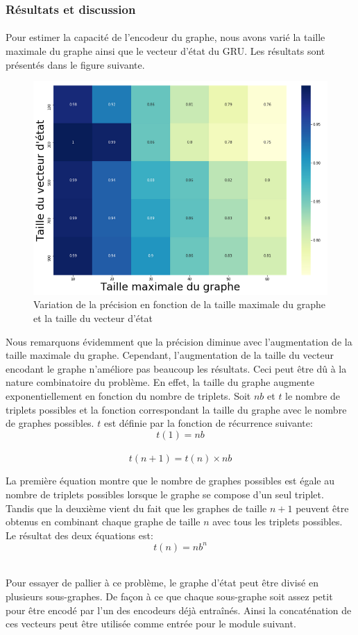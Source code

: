 \subsubsection{Résultats et discussion}
\paragraph{}Pour estimer la capacité de l'encodeur du graphe, nous avons varié la taille maximale du graphe ainsi que le vecteur d'état du GRU. Les résultats sont présentés dans le figure suivante.
\begin{figure}[H] 
	\centering
	\includegraphics[width=0.95\linewidth]{images/Realisation/DM/heatmap.png}
	\caption{Variation de la précision en fonction de la taille maximale du graphe et la taille du vecteur d'état}\label{heatmap}
\end{figure}
\par Nous remarquons évidemment que la précision diminue avec l'augmentation de la taille maximale du graphe. Cependant, l'augmentation de la taille du vecteur encodant le graphe n'améliore pas beaucoup les résultats. Ceci peut être dû à la nature combinatoire du problème. En effet, la taille du graphe augmente exponentiellement en fonction du nombre de triplets. Soit $nb$ et $t$ le nombre de triplets possibles et la fonction correspondant la taille du graphe avec le nombre de graphes possibles. $t$ est définie par la fonction de récurrence suivante:
\[t(1) = nb\]\\
\[t(n+1) = t(n) \times nb\]
\par La première équation montre que le nombre de graphes possibles est égale au nombre de triplets possibles lorsque le graphe se compose d'un seul triplet. Tandis que la deuxième vient du fait que les graphes de taille $n+1$ peuvent être obtenus en combinant chaque graphe de taille $n$ avec tous les triplets possibles. Le résultat des deux équations est:
\[t(n) = nb^n\]\\
\par Pour essayer de pallier à ce problème, le graphe d'état peut être divisé en plusieurs sous-graphes. De façon à ce que chaque sous-graphe soit assez petit pour être encodé par l'un des encodeurs déjà entraînés. Ainsi la concaténation de ces vecteurs peut être utilisée comme entrée pour le module suivant.
